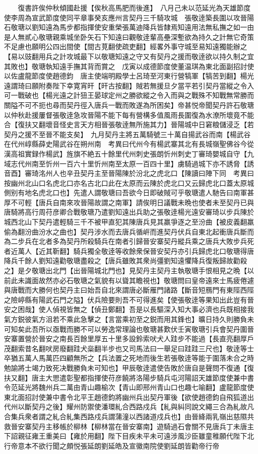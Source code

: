 　　復書許俟仲秋傾國赴援【俟秋高馬肥而後進】　八月己未以范延光為天雄節度使李周為宣武節度使同平章事癸亥應州言契丹三千騎攻城　張敬逹築長圍以攻晉陽石敬瑭以劉知遠為馬步都指揮使安重榮張萬迪降兵皆隸焉知遠用法無私撫之如一由是人無貳心敬瑭親乘城坐卧矢石下知遠曰觀敬逹輩高壘深塹欲為持久之計無它奇策不足慮也願明公四出間使【間古莧翻使疏吏翻】經畧外事守城至易知遠獨能辦之【易以豉翻用兵之計攻城最下以敬瑭知遠之守又有契丹之援而敬逹欲以持久制之宜其敗也】敬瑭執知遠手撫其背而賞之　戊寅以成德節度使董温琪為東北面副招討使以佐盧龍節度使趙德鈞　唐主使端明殿學士呂琦至河東行營犒軍【犒苦到翻】楊光遠謂琦曰願附奏陛下幸寛宵旰【旰古按翻】賊若無援旦夕當平若引契丹當縱之令入可一戰破也【楊光遠之計狃王晏球定州之勝欲縱之令入而與之戰殊不知戰無常勝而關隘不可不扼也尋而契丹徑入唐兵一戰而敗遂為所困矣】帝甚悦帝聞契丹許石敬瑭以仲秋赴援屢督張敬逹急攻晉陽不能下每有營構多值風雨長圍復為水潦所壞竟不能合【復扶又翻壞音怪史言天方相晉張敬逹無所施其力】晉陽城中日窘粮儲浸乏【若契丹之援不至晉不能支矣】　九月契丹主將五萬騎號三十萬自揚武谷而南【楊武谷在代州崞縣薛史陽武谷在朔州南　考異曰代州今有楊武寨其北有長城嶺聖佛谷今從漢高祖實録作楊武】旌旗不絶五十餘里代州刺史張朗忻州刺史丁審琦嬰城自守【九域志代州南至忻州一百六十里忻州南至太原一百四十里】虜騎過城下亦不誘脅【誘音酉】審琦洺州人也辛丑契丹主至晉陽陳於汾北之虎北口【陳讀曰陣下同　考異曰按幽州北山口名虎北口亦名古北口此在太原而云陳於虎北口又云歸虎北口蓋太原城側别有地名虎北口也】先遣人謂敬瑭曰吾欲今日即破賊可乎敬瑭遣人馳告曰南軍甚厚不可輕【唐兵自南來攻晉陽故謂之南軍】請俟明日議戰未晩也使者未至契丹已與唐騎將高行周苻彦卿合戰敬瑭乃遣劉知遠出兵助之張敬逹楊光遠安審琦以步兵陳於城西北山下契丹遣輕騎三千不被甲直犯其陳唐兵見其羸爭逐之至汾曲【被皮義翻羸偷為翻汾曲汾水之曲也】契丹涉水而去唐兵循㟁而進契丹伏兵自東北起衝唐兵斷而為二步兵在北者多為契丹所殺騎兵在南者引歸晉安寨契丹縱兵乘之唐兵大敗步兵死者近萬人【近其靳翻】騎兵獨全敬逹等收餘衆保晉安契丹亦引兵歸虎北口敬瑭得唐降兵千餘人劉知遠勸敬瑭盡殺之【唐兵雖敗其衆尚彊劉知遠懼降兵復叛歸故勸殺之】是夕敬瑭出北門【出晉陽城北門也】見契丹主契丹主執敬瑭手恨相見之晩【以前此未識面故然亦必石敬瑭之氣貌有以聳其瞻視也】敬瑭問曰皇帝遠來士馬疲倦遽與唐戰而大勝何也契丹主曰始吾自北來謂唐必斷雁門諸路【斷音短鴈門有東陘西陘之險嵉縣有陽武石門之隘】伏兵險要則吾不可得進矣【使張敬逹等果知出此豈有晉安之困哉】使人偵視皆無之【偵丑鄭翻】吾是以長驅深入知大事必濟也兵既相接我氣方鋭彼氣方沮若不乘此急擊之【言當乘初至之鋭而用其鋒也】曠日持久則勝負未可知矣此吾所以亟戰而勝不可以勞逸常理論也敬瑭甚歎伏壬寅敬瑭引兵會契丹圍晉安寨置營於晉安之南長百餘里厚五十里多設鈴索吠犬人跬步不能過【長直亮翻厚戶茂翻索昔名翻吠房廢翻跬犬橤翻半步也又司馬法曰一舉足曰跬跬三尺也】敬逹等士卒猶五萬人馬萬匹四顧無所之【兵法置之死地而後生若張敬逹等能于圍落未合之時勉諭將士竭力致死决戰勝負未可知也】甲辰敬逹遣使告敗於唐自是聲問不復通【復扶又翻】唐主大愳遣彰聖都指揮使苻彦饒將洛陽步騎兵屯河陽詔天雄節度使兼中書令范延光將魏州兵二萬由青山趣榆次【青山即邢州青山口也趣七喻翻】盧龍節度使東北面招討使兼中書令北平王趙德鈞將幽州兵出契丹軍後【欲使趙德鈞自飛狐道出代州以斷契丹之後】耀州防禦使潘環糺合西路戍兵【糺與糾同說文繩三合為糺故凡合集兵衆者謂之糺合糺集西路戍兵謂蒲潼以西諸道戍兵也】由晉絳兩乳嶺出慈隰共救晉安寨契丹主移帳於柳林【柳林當在晉安寨南】遊騎過石會關不見唐兵丁未唐主下詔親征雍王重美曰【雍於用翻】陛下目疾未平未可遠涉風沙臣雖童稚願代陛下北行帝意本不欲行聞之頗悦張延朗劉延皓及宣徽南院使劉延朗皆勸帝行帝